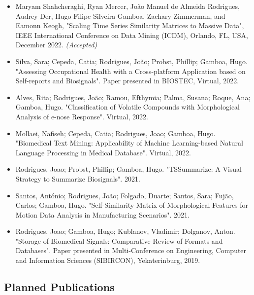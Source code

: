 \begin{itemize}

\item Maryam Shahcheraghi, Ryan Mercer, João Manuel de Almeida Rodrigues, Audrey Der, Hugo Filipe Silveira Gamboa, Zachary Zimmerman, and Eamonn Keogh, "Scaling Time Series Similarity Matrices to Massive Data", IEEE International Conference on Data Mining (ICDM), Orlando, FL, USA, December 2022. \textit{(Accepted)}

\item Silva, Sara; Cepeda, Catia; Rodrigues, João; Probst, Phillip; Gamboa, Hugo. "Assessing Occupational Health with a Cross-platform Application based on Self-reports and Biosignals". Paper presented in BIOSTEC, Virtual, 2022.

\item Alves, Rita; Rodrigues, João; Ramou, Efthymia; Palma, Susana; Roque, Ana; Gamboa, Hugo. "Classification of Volatile Compounds with Morphological Analysis of e-nose Response". Virtual, 2022.

\item Mollaei, Nafiseh; Cepeda, Catia; Rodrigues, Joao; Gamboa, Hugo. "Biomedical Text Mining: Applicability of Machine Learning-based Natural Language Processing in Medical Database". Virtual, 2022.

\item Rodrigues, Joao; Probst, Phillip; Gamboa, Hugo. "TSSummarize: A Visual Strategy to Summarize Biosignals". 2021.

\item Santos, António; Rodrigues, João; Folgado, Duarte; Santos, Sara; Fujão, Carlos; Gamboa, Hugo. "Self-Similarity Matrix of Morphological Features for Motion Data Analysis in Manufacturing Scenarios". 2021.

\item Rodrigues, Joao; Gamboa, Hugo; Kublanov, Vladimir; Dolganov, Anton. "Storage of Biomedical Signals: Comparative Review of Formats and Databases". Paper presented in Multi-Conference on Engineering, Computer and Information Sciences (SIBIRCON), Yekaterinburg, 2019.

\end{itemize}

\subsection{Planned Publications}


